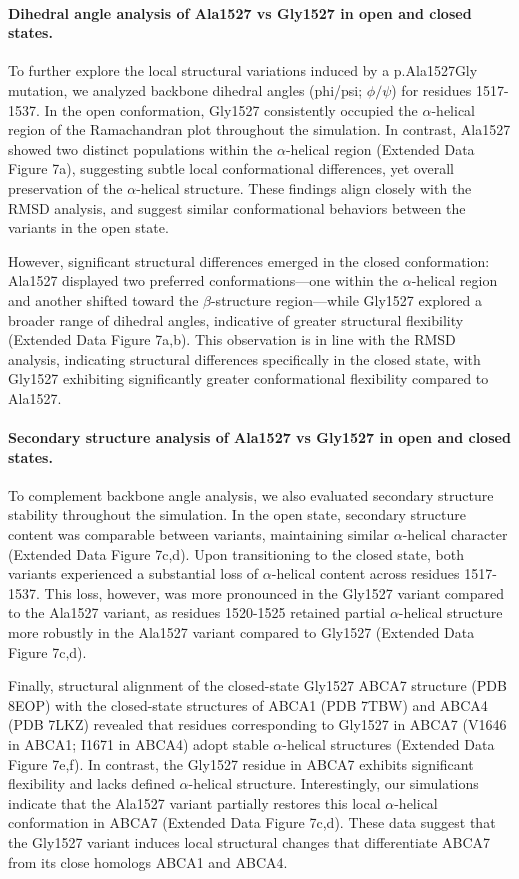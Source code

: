 \paragraph{Dihedral angle analysis of Ala1527 vs Gly1527 in open and closed states.}
To further explore the local structural variations induced by a p.Ala1527Gly mutation, we analyzed backbone dihedral angles (phi/psi; $\phi/\psi$) for residues 1517-1537. In the open conformation, Gly1527 consistently occupied the $\alpha$-helical region of the Ramachandran plot throughout the simulation. In contrast, Ala1527 showed two distinct populations within the $\alpha$-helical region (Extended Data Figure 7a), suggesting subtle local conformational differences, yet overall preservation of the $\alpha$-helical structure. These findings align closely with the RMSD analysis, and suggest similar conformational behaviors between the variants in the open state.

However, significant structural differences emerged in the closed conformation: Ala1527 displayed two preferred conformations—one within the $\alpha$-helical region and another shifted toward the $\beta$-structure region—while Gly1527 explored a broader range of dihedral angles, indicative of greater structural flexibility (Extended Data Figure 7a,b). This observation is in line with the RMSD analysis, indicating structural differences specifically in the closed state, with Gly1527 exhibiting significantly greater conformational flexibility compared to Ala1527.

\paragraph{Secondary structure analysis of Ala1527 vs Gly1527 in open and closed states.}
To complement backbone angle analysis, we also evaluated secondary structure stability throughout the simulation. In the open state, secondary structure content was comparable between variants, maintaining similar $\alpha$-helical character (Extended Data Figure 7c,d). Upon transitioning to the closed state, both variants experienced a substantial loss of $\alpha$-helical content across residues 1517-1537. This loss, however, was more pronounced in the Gly1527 variant compared to the Ala1527 variant, as residues 1520-1525 retained partial $\alpha$-helical structure more robustly in the Ala1527 variant compared to Gly1527 (Extended Data Figure 7c,d).

Finally, structural alignment of the closed-state Gly1527 ABCA7 structure (PDB 8EOP) with the closed-state structures of ABCA1 (PDB 7TBW) and ABCA4 (PDB 7LKZ) revealed that residues corresponding to Gly1527 in ABCA7 (V1646 in ABCA1; I1671 in ABCA4) adopt stable $\alpha$-helical structures (Extended Data Figure 7e,f). In contrast, the Gly1527 residue in ABCA7 exhibits significant flexibility and lacks defined $\alpha$-helical structure. Interestingly, our simulations indicate that the Ala1527 variant partially restores this local $\alpha$-helical conformation in ABCA7 (Extended Data Figure 7c,d). These data suggest that the Gly1527 variant induces local structural changes that differentiate ABCA7 from its close homologs ABCA1 and ABCA4.
